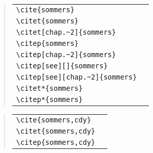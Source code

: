 \documentclass[UTF8,a4paper,zihao=5]{ctexart}
\begin{document}
\begin{quote}
\begin{tabular}{l@{\quad$\Rightarrow$\quad}l}
  \verb|\cite{sommers}| & \cite{sommers}\\
  \verb|\citet{sommers}| & \citet{sommers}\\
  \verb|\citet[chap.~2]{sommers}| & \citet[chap.~2]{sommers}\\[0.5ex]
  \verb|\citep{sommers}| & \citep{sommers}\\
  \verb|\citep[chap.~2]{sommers}| & \citep[chap.~2]{sommers}\\
  \verb|\citep[see][]{sommers}| & \citep[see][]{sommers}\\
  \verb|\citep[see][chap.~2]{sommers}| & \citep[see][chap.~2]{sommers}\\[0.5ex]
  \verb|\citet*{sommers}| & \citet*{sommers}\\
  \verb|\citep*{sommers}| & \citep*{sommers}
\end{tabular}
\end{quote}
\begin{quote}
\begin{tabular}{l@{\quad$\Rightarrow$\quad}l}
  \verb|\cite{sommers,cdy}| & \cite{sommers,cdy}\\
  \verb|\citet{sommers,cdy}| & \citet{sommers,cdy}\\
  \verb|\citep{sommers,cdy}| & \citep{sommers,cdy}
\end{tabular}
\end{quote}

\nocite{*}


\end{document}
